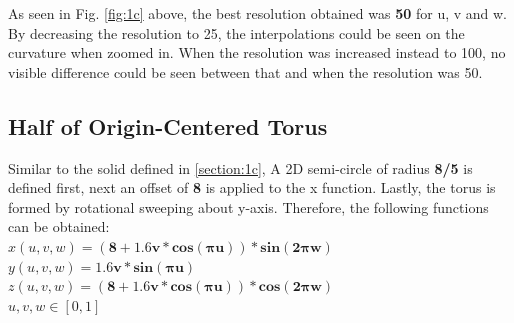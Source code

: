 \documentclass[acmlarge,nonacm=true]{acmart}
\begin{document}
As seen in Fig. \ref{fig:1c} above, the best resolution obtained was \textbf{50} for u, v and w.
By decreasing the resolution to 25, the interpolations could be seen on the curvature when zoomed in. 
When the resolution was increased instead to 100, no visible difference could be seen between that and when the resolution was 50.

\subsection{Half of Origin-Centered Torus}
\label{section:1d}
Similar to the solid defined in \ref{section:1c}, A 2D semi-circle of radius \textbf{8/5} 
is defined first, next an offset of \textbf{8} is applied to the x function. Lastly, the torus is formed by
rotational sweeping about y-axis. Therefore, the following functions can be obtained:\\
\(x(u,v,w) = \mathbf{(8 + 1.6v*cos(\pi u))*sin(2\pi w)}\)\\
\(y(u,v,w) = \mathbf{1.6v*sin(\pi u)}\)\\
\(z(u,v,w) = \mathbf{(8 + 1.6v*cos(\pi u))*cos(2\pi w)}\)\\
\(u,v,w \in [0,1]\)
\end{document}

